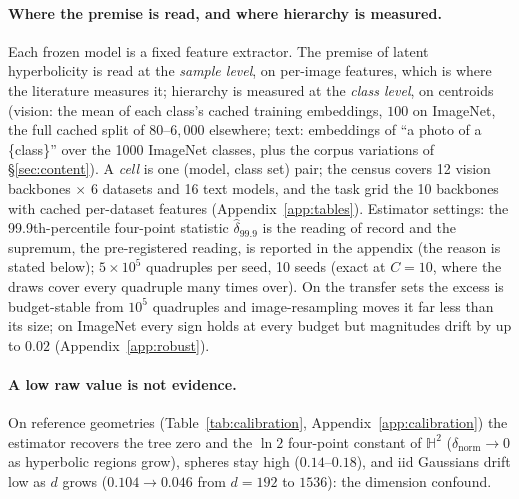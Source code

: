 \documentclass{article}
\begin{document}
\paragraph{Where the premise is read, and where hierarchy is measured.} Each frozen model is a fixed feature extractor. The premise of latent hyperbolicity is read at the \emph{sample level}, on per-image features, which is where the literature measures it; hierarchy is measured at the \emph{class level}, on centroids (vision: the mean of each class's cached training embeddings, $100$ on ImageNet, the full cached split of $80$--$6{,}000$ elsewhere; text: embeddings of ``a photo of a \{class\}'' over the 1000 ImageNet classes, plus the corpus variations of \S\ref{sec:content}). A \emph{cell} is one (model, class set) pair; the census covers 12 vision backbones $\times$ 6 datasets and 16 text models, and the task grid the 10 backbones with cached per-dataset features (Appendix~\ref{app:tables}).
Estimator settings: the 99.9th-percentile four-point statistic $\hat\delta_{99.9}$ is the reading of record and the supremum, the pre-registered reading, is reported in the appendix (the reason is stated below); $5{\times}10^5$ quadruples per seed, 10 seeds (exact at $C{=}10$, where the draws cover every quadruple many times over). On the transfer sets the excess is budget-stable from $10^5$ quadruples and image-resampling moves it far less than its size; on ImageNet every sign holds at every budget but magnitudes drift by up to $0.02$ (Appendix~\ref{app:robust}).

\paragraph{A low raw value is not evidence.} On reference geometries (Table~\ref{tab:calibration}, Appendix~\ref{app:calibration}) the estimator recovers the tree zero and the $\ln 2$ four-point constant of $\mathbb{H}^2$ ($\delta_{\text{norm}}\to0$ as hyperbolic regions grow), spheres stay high ($0.14$--$0.18$), and iid Gaussians drift low as $d$ grows ($0.104\to0.046$ from $d{=}192$ to $1536$): the dimension confound.
\end{document}
